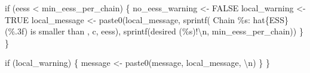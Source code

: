 \documentclass[
  letterpaper,
  DIV=11,
  numbers=noendperiod]{scrartcl}
\newenvironment{Shaded}{\begin{snugshade}}{\end{snugshade}}
\newcommand{\CharTok}[1]{\textcolor[rgb]{0.13,0.47,0.30}{#1}}
\newcommand{\ControlFlowTok}[1]{\textcolor[rgb]{0.00,0.23,0.31}{#1}}
\newcommand{\NormalTok}[1]{\textcolor[rgb]{0.00,0.23,0.31}{#1}}
\newcommand{\OperatorTok}[1]{\textcolor[rgb]{0.37,0.37,0.37}{#1}}
\newcommand{\SpecialCharTok}[1]{\textcolor[rgb]{0.37,0.37,0.37}{#1}}
\newcommand{\StringTok}[1]{\textcolor[rgb]{0.13,0.47,0.30}{#1}}
\begin{document}
\begin{Shaded}
\begin{Highlighting}[]
      \ControlFlowTok{if}\NormalTok{ (eess }\OperatorTok{\textless{}}\NormalTok{ min\_eess\_per\_chain) \{}
\NormalTok{        no\_eess\_warning }\OperatorTok{\textless{}{-}}\NormalTok{ FALSE}
\NormalTok{        local\_warning }\OperatorTok{\textless{}{-}}\NormalTok{ TRUE}
\NormalTok{        local\_message }\OperatorTok{\textless{}{-}}
\NormalTok{          paste0(local\_message,}
\NormalTok{                 sprintf(}\StringTok{\textquotesingle{}  Chain }\SpecialCharTok{\%s}\StringTok{: hat}\SpecialCharTok{\{ESS\}}\StringTok{ (}\SpecialCharTok{\%.3f}\StringTok{) is smaller than \textquotesingle{}}\NormalTok{,}
\NormalTok{                         c, eess),}
\NormalTok{                 sprintf(}\StringTok{\textquotesingle{}desired (}\SpecialCharTok{\%s}\StringTok{)!}\CharTok{\textbackslash{}n}\StringTok{\textquotesingle{}}\NormalTok{, min\_eess\_per\_chain))}
\NormalTok{      \}}
\NormalTok{    \}}
    
    \ControlFlowTok{if}\NormalTok{ (local\_warning) \{}
\NormalTok{      message }\OperatorTok{\textless{}{-}}\NormalTok{ paste0(message, local\_message, }\StringTok{\textquotesingle{}}\CharTok{\textbackslash{}n}\StringTok{\textquotesingle{}}\NormalTok{)}
\NormalTok{    \}}
\NormalTok{  \}}


\end{Highlighting}
\end{Shaded}
\end{document}
